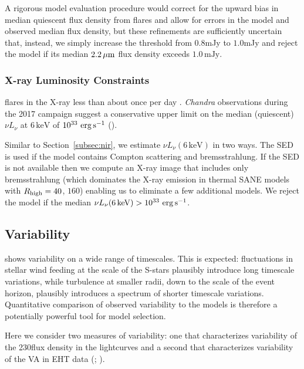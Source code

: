 A rigorous model evaluation procedure would correct for the upward bias in median quiescent flux density from flares and allow for errors in the model and observed median flux density, but these refinements are sufficiently uncertain that, instead, we simply increase the threshold from $0.8$mJy to $1.0$mJy and reject the model if its 
median $2.2\,\mu\mathrm{m}$ flux density exceeds $1.0\,\mathrm{mJy}$.

\subsubsection{X-ray Luminosity Constraints}

\sgra flares in the X-ray less than about once per day \citep[see][and references therein]{2018MNRAS.473..306Y}.
\emph{Chandra} observations during the 2017 campaign suggest a conservative upper limit on the median (quiescent) $\nu L_\nu$ at $6\,\mathrm{keV}$ of $10^{33}\,\,\mathrm{erg}\,\mathrm{s}^{-1}$ ().

Similar to Section~\ref{subsec:nir}, we estimate $\nu L_\nu(6\,\mathrm{keV})$ in two ways.  The SED is used if the model contains Compton scattering and bremsstrahlung.  If the SED is not available then we compute an X-ray image that includes only bremsstrahlung (which dominates the X-ray emission in thermal SANE models with $R_\mathrm{high} = 40$, $160$) enabling us to eliminate a few additional models.  We reject the model if the median $\nu L_\nu(6\,\mathrm{keV}) > 10^{33}\,\,\mathrm{erg}\,\mathrm{s}^{-1}$.


\subsection{Variability}

\sgra shows variability on a wide range of timescales.  This is expected: fluctuations in stellar wind feeding at the scale of the S-stars plausibly introduce long timescale variations, while turbulence at smaller radii, down to the scale of the event horizon, plausibly introduces a spectrum of shorter timescale variations.  Quantitative comparison of observed variability to the models is therefore a potentially powerful tool for model selection.

Here we consider two measures of variability: one that characterizes variability of the 230\GHz flux density in the lightcurves \citep{Wielgus2022} and a second that characterizes variability of the VA in EHT data (; \citealt{NoiseModeling}).


